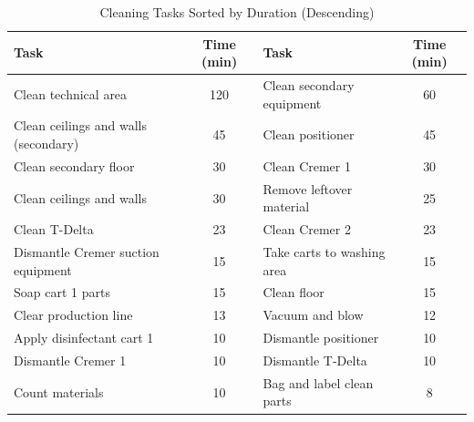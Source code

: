 \begin{table}[H]

\centering

\caption{Cleaning Tasks Sorted by Duration (Descending)}
\label{tbl:SMED_Tasks}
\begin{tabularx}{\textwidth}{l c l c}

\toprule

\textbf{Task} & \textbf{Time (min)} & \textbf{Task} & \textbf{Time (min)} \\

\midrule

Clean technical area & 120 & Clean secondary equipment & 60 \\

Clean ceilings and walls (secondary) & 45 & Clean positioner & 45 \\

Clean secondary floor & 30 & Clean Cremer 1 & 30 \\

Clean ceilings and walls & 30 & Remove leftover material & 25 \\

Clean T-Delta & 23 & Clean Cremer 2 & 23 \\

Dismantle Cremer suction equipment & 15 & Take carts to washing area & 15 \\

Soap cart 1 parts & 15 & Clean floor & 15 \\

Clear production line & 13 & Vacuum and blow & 12 \\

Apply disinfectant cart 1 & 10 & Dismantle positioner & 10 \\

Dismantle Cremer 1 & 10 & Dismantle T-Delta & 10 \\

Count materials & 10 & Bag and label clean parts & 8 \\

\midrule

\end{tabularx}

\end{table}
